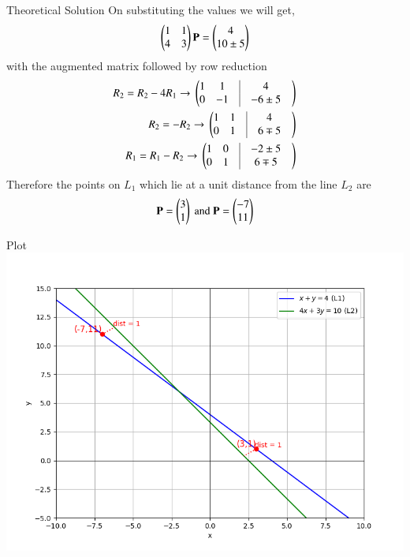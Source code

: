 \documentclass{beamer}
\begin{document}
\begin{frame}{Theoretical Solution}
On substituting the values we will get,
\begin{align}
    \begin{pmatrix}1&1\\4&3\end{pmatrix}\mathbf{P}=\begin{pmatrix}4\\10\pm5\end{pmatrix}
\end{align}
with the augmented matrix followed by row reduction 
\begin{align}
	R_2 = R_2 - 4 R_1\rightarrow{}\myvec{1&1 &\vrule &  4&\\ 0&-1 & \vrule& -6\pm5&} \\  
	R_2 = -R_2\rightarrow{}\myvec{1&1&\vrule& 4& \\ 0&1 & \vrule &6\mp5} \nonumber \\
	R_1 = R_1-R_2\rightarrow{}\myvec{1&0 & \vrule &-2\pm5&\\ 0&1& \vrule &6\mp5}\nonumber
\end{align}
Therefore the points on $L_1$ which lie at a unit distance from the line $L_2$ are
\begin{align*}
    \mathbf{P}=\begin{pmatrix}3\\1\end{pmatrix} \ \text{and} \ \mathbf{P}=\begin{pmatrix}-7\\11\end{pmatrix}
\end{align*}
\end{frame}

\begin{frame}{Plot}
    \centering
    \includegraphics[width=\columnwidth, height=0.8\textheight, keepaspectratio]{figs/fig.png}     
\end{frame}
\end{document}

